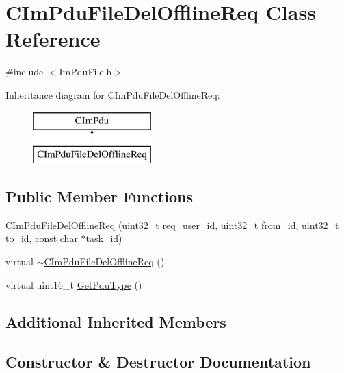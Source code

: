 \hypertarget{class_c_im_pdu_file_del_offline_req}{}\section{C\+Im\+Pdu\+File\+Del\+Offline\+Req Class Reference}
\label{class_c_im_pdu_file_del_offline_req}


{\ttfamily \#include $<$Im\+Pdu\+File.\+h$>$}

Inheritance diagram for C\+Im\+Pdu\+File\+Del\+Offline\+Req\+:\begin{figure}[H]
\begin{center}
\leavevmode
\includegraphics[height=2.000000cm]{class_c_im_pdu_file_del_offline_req}
\end{center}
\end{figure}
\subsection*{Public Member Functions}
\begin{DoxyCompactItemize}
\item 
\hyperlink{class_c_im_pdu_file_del_offline_req_aa4861d7e71557c8e971a363ca3497bfa}{C\+Im\+Pdu\+File\+Del\+Offline\+Req} (uint32\+\_\+t req\+\_\+user\+\_\+id, uint32\+\_\+t from\+\_\+id, uint32\+\_\+t to\+\_\+id, const char $\ast$task\+\_\+id)
\item 
virtual \hyperlink{class_c_im_pdu_file_del_offline_req_ae0559a6172d3e186c5ddca615c3574f0}{$\sim$\+C\+Im\+Pdu\+File\+Del\+Offline\+Req} ()
\item 
virtual uint16\+\_\+t \hyperlink{class_c_im_pdu_file_del_offline_req_a71070fe1edd92d8c3a42044bc69f597c}{Get\+Pdu\+Type} ()
\end{DoxyCompactItemize}
\subsection*{Additional Inherited Members}


\subsection{Constructor \& Destructor Documentation}
\hypertarget{class_c_im_pdu_file_del_offline_req_aa4861d7e71557c8e971a363ca3497bfa}{}
